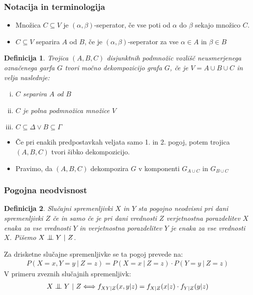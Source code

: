 \documentclass{beamer}
\newtheorem{definicija}{Definicija}
\newcommand{\cond}{\mathrel{\text{\scalebox{1.07}{$\perp\mkern-10mu\perp$}}}}
\begin{document}
\begin{frame}
    \frametitle{Notacija in terminologija}
    \begin{itemize}
        \item Množica $C \subseteq V $ je $ (\alpha, \beta)$-seperator, če vse poti od $\alpha$ do $\beta$ sekajo 
        množico $C$.
        \item $C \subseteq V $ separira $A$ od $B$, če je $ (\alpha, \beta)$-seperator za vse $\alpha \in A$
        in $\beta \in B$
    \end{itemize}
    \begin{definicija}
        Trojica $(A, B, C)$ disjunktnih podmnožic vozlišč neusmerjenega označenega garfa $G$ tvori
        močno dekompozicijo grafa $G$, če je $V = A \cup B \cup C$ in velja naslednje:
        \begin{enumerate}[(i)]
            \item $C$ separira $A$ od $B$
            \item $C$ je polna podmnožica množice $V$
            \item $C \subseteq \Delta \lor B \subseteq \Gamma$
        \end{enumerate}
    \end{definicija}
    \begin{itemize}
        \item Če pri enakih predpostavkah veljata samo 1. in 2. pogoj, potem trojica  $(A, B, C)$
        tvori šibko dekompozicijo.
        \item Pravimo, da $(A, B, C)$ dekompozira $G$ v komponenti $G_{A \cup C}$ 
        in $G_{B \cup C} $
    \end{itemize}

\end{frame}
\begin{frame}
    \frametitle{Pogojna neodvisnost}
    \begin{definicija}
        Slučajni spremenljivki $X$ in $Y$ sta pogojno neodvisni pri dani spremenljivki
        $Z$  če in samo če je pri dani vrednosti $Z$ verjetnostna porazdelitev $X$ enaka
        za vse vrednosti $Y$ in verjetnostna porazdelitev $Y$ je enaka za vse vrednosti
        $X$. Pišemo $ X \cond Y ~|~ Z $. 
    \end{definicija}
    Za drisketne slučajne spremenljivke se ta pogoj prevede na: 
    \begin{align*}
         P(X=x, Y=y ~|~ Z=z) = P(X=x~|~Z=z) \cdot P(Y=y~|~Z=z) 
    \end{align*} 
    V primeru zveznih slučajnih spremenljivk:
    \begin{align*}
        X \cond Y ~|~ Z \Longleftrightarrow  f_{XY|Z} (x,y|z) = f_{X|Z} (x|z) \cdot f_{Y|Z} (y|z)\\
    \end{align*}
\end{frame}
\end{document}
